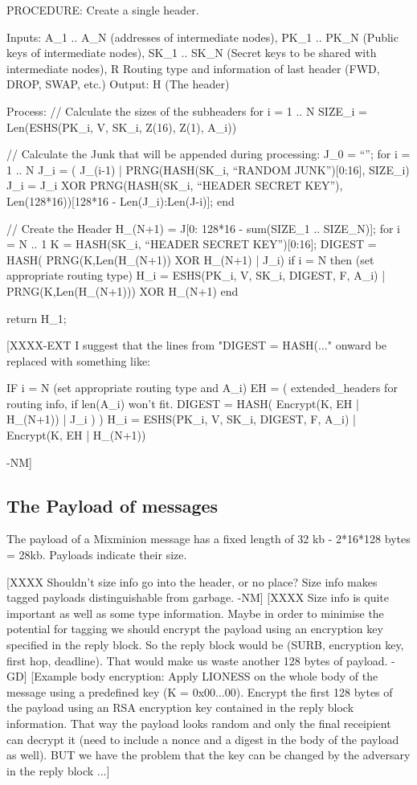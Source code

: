 PROCEDURE: Create a single header.

Inputs: A_1 .. A_N (addresses of intermediate nodes), 
	PK_1 .. PK_N (Public keys of intermediate nodes),
	SK_1 .. SK_N (Secret keys to be shared with intermediate nodes),
        R Routing type and information of last header (FWD, DROP, SWAP, etc.)
Output: H (The header)

Process: 
  // Calculate the sizes of the subheaders
  for i = 1 .. N
	SIZE_i = Len(ESHS(PK_i, V, SK_i, Z(16), Z(1), A_i))

  // Calculate the Junk that will be appended during processing:
  J_0 = ``'';
  for i = 1 .. N
	J_i = ( J_(i-1) | PRNG(HASH(SK_i, ``RANDOM JUNK'')[0:16], SIZE_i)
	J_i = J_i XOR PRNG(HASH(SK_i, ``HEADER SECRET KEY''),
  		Len(128*16))[128*16 - Len(J_i):Len(J-i)];
  end

  // Create the Header
  H_(N+1) = J[0: 128*16 - sum(SIZE_1 .. SIZE_N)];
  for i = N .. 1
	K = HASH(SK_i, ``HEADER SECRET KEY'')[0:16];
  	DIGEST = HASH( PRNG(K,Len(H_(N+1)) XOR H_(N+1) | J_i)
	if i = N then (set appropriate routing type)
	H_i = ESHS(PK_i, V, SK_i, DIGEST, F, A_i) | PRNG(K,Len(H_(N+1))) XOR H_(N+1)
  end

return H_1;

  [XXXX-EXT I suggest that the lines from "DIGEST = HASH(..." onward
   be replaced with something like:

	IF i = N (set appropriate routing type and A_i)
	EH = ( extended_headers for routing info, if len(A_i) won't fit.
  	DIGEST = HASH( Encrypt(K, EH | H_(N+1)) | J_i ) )
	H_i = ESHS(PK_i, V, SK_i, DIGEST, F, A_i) | Encrypt(K, EH | H_(N+1))

      -NM]

\subsection{The Payload of messages}

The payload of a Mixminion message has a fixed length of 32 kb
- 2*16*128 bytes = 28kb.   Payloads indicate their size.

  [XXXX Shouldn't size info go into the header, or no place?  Size
     info makes tagged payloads distinguishable from garbage. -NM]
  [XXXX Size info is quite important as well as some type information.
     Maybe in order to minimise the potential for tagging we should
     encrypt the payload using an encryption key specified in the
     reply block. So the reply block would be (SURB, encryption key,
     first hop, deadline). That would make us waste another 128 bytes
     of payload. -GD]
  [Example body encryption: Apply LIONESS on the whole body of the
     message using a predefined key (K = 0x00...00). Encrypt the first
     128 bytes of the payload using an RSA encryption key contained in
     the reply block information. That way the payload looks random
     and only the final receipient can decrypt it (need to include a
     nonce and a digest in the body of the payload as well). BUT we
     have the problem that the key can be changed by the adversary in
     the reply block ...]

